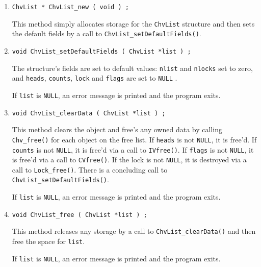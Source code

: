 \begin{enumerate}
\item
\begin{verbatim}
ChvList * ChvList_new ( void ) ;
\end{verbatim}
This method simply allocates storage 
for the {\tt ChvList} structure 
and then sets the default fields by a call to 
{\tt ChvList\_setDefaultFields()}.
\item
\begin{verbatim}
void ChvList_setDefaultFields ( ChvList *list ) ;
\end{verbatim}
The structure's fields are set to default values:
{\tt nlist} and {\tt nlocks} set to zero,
and {\tt heads}, {\tt counts}, {\tt lock} and {\tt flags} 
are set to {\tt NULL} .
\par {}
If {\tt list} is {\tt NULL},
an error message is printed and the program exits.
\item
\begin{verbatim}
void ChvList_clearData ( ChvList *list ) ;
\end{verbatim}
This method clears the object and free's any owned data
by calling {\tt Chv\_free()} for each object on the free
list.
If {\tt heads} is not {\tt NULL}, it is free'd.
If {\tt counts} is not {\tt NULL}, 
it is free'd via a call to {\tt IVfree()}.
If {\tt flags} is not {\tt NULL}, 
it is free'd via a call to {\tt CVfree()}.
If the lock is not {\tt NULL}, it is destroyed via a call to
{\tt Lock\_free()}.
There is a concluding call to 
{\tt ChvList\_setDefaultFields()}.
\par {}
If {\tt list} is {\tt NULL},
an error message is printed and the program exits.
\item
\begin{verbatim}
void ChvList_free ( ChvList *list ) ;
\end{verbatim}
This method releases any storage by a call to 
{\tt ChvList\_clearData()} 
and then free the space for {\tt list}.
\par {}
If {\tt list} is {\tt NULL},
an error message is printed and the program exits.
\end{enumerate}
\par
